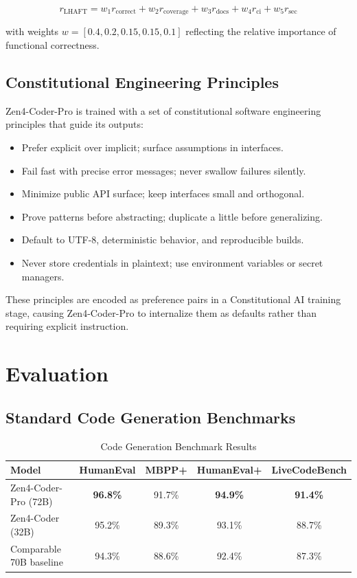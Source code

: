 \documentclass[11pt,a4paper]{article}
\begin{document}
\begin{equation}
  r_{\text{LHAFT}} = w_1 r_{\text{correct}} + w_2 r_{\text{coverage}} + w_3 r_{\text{docs}} + w_4 r_{\text{ci}} + w_5 r_{\text{sec}}
\end{equation}

with weights $w = [0.4, 0.2, 0.15, 0.15, 0.1]$ reflecting the relative importance of functional correctness.

\subsection{Constitutional Engineering Principles}

Zen4-Coder-Pro is trained with a set of constitutional software engineering principles that guide its outputs:

\begin{itemize}
  \item Prefer explicit over implicit; surface assumptions in interfaces.
  \item Fail fast with precise error messages; never swallow failures silently.
  \item Minimize public API surface; keep interfaces small and orthogonal.
  \item Prove patterns before abstracting; duplicate a little before generalizing.
  \item Default to UTF-8, deterministic behavior, and reproducible builds.
  \item Never store credentials in plaintext; use environment variables or secret managers.
\end{itemize}

These principles are encoded as preference pairs in a Constitutional AI training stage, causing Zen4-Coder-Pro to internalize them as defaults rather than requiring explicit instruction.

\section{Evaluation}

\subsection{Standard Code Generation Benchmarks}

\begin{table}[H]
\centering
\caption{Code Generation Benchmark Results}
\begin{tabular}{lcccc}
\toprule
\textbf{Model} & \textbf{HumanEval} & \textbf{MBPP+} & \textbf{HumanEval+} & \textbf{LiveCodeBench} \\
\midrule
Zen4-Coder-Pro (72B) & \textbf{96.8\%} & 91.7\% & \textbf{94.9\%} & \textbf{91.4\%} \\
Zen4-Coder (32B) & 95.2\% & 89.3\% & 93.1\% & 88.7\% \\
Comparable 70B baseline & 94.3\% & 88.6\% & 92.4\% & 87.3\% \\
\bottomrule
\end{tabular}
\end{table}
\end{document}
